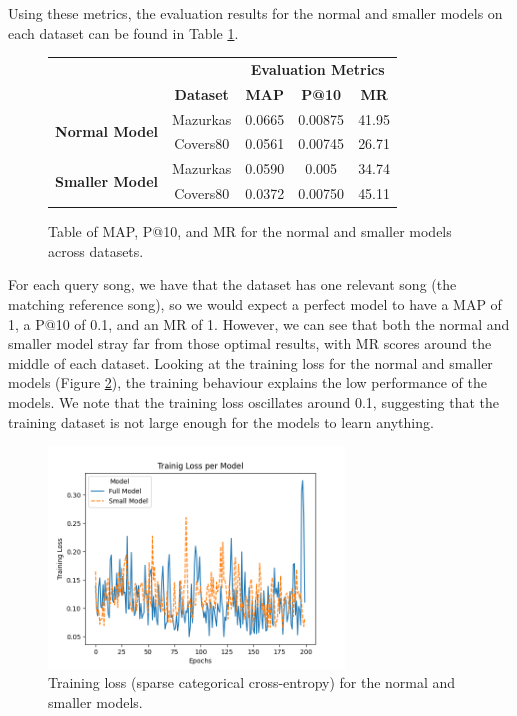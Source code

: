 \documentclass{article}
\begin{document}
Using these metrics, the evaluation results for the normal and smaller models on each dataset can be found in Table \ref{tbl:fullmodelresults}.

{\renewcommand{\arraystretch}{1.3}
\begin{figure}[h]
    \centering
    \begin{tabular}{|c|c|c|c|c|}
        \hline
        \rowcolor{lightgray} & & \multicolumn{3}{|c|}{\textbf{Evaluation Metrics}} \\
        \cline{3-5}
        \rowcolor{lightgray}& \textbf{Dataset} & \textbf{MAP} & \textbf{P@10} & \textbf{MR} \\
        \hline
        \multirow{2}{*}{\textbf{Normal Model}} & Mazurkas & 0.0665 & 0.00875 & 41.95 \\
        \cline{2-5}
        & Covers80 & 0.0561 & 0.00745 & 26.71 \\
        \hline
        \multirow{2}{*}{\textbf{Smaller Model}} & Mazurkas & 0.0590 & 0.005 & 34.74 \\
        \cline{2-5}
        & Covers80 & 0.0372 & 0.00750 & 45.11 \\
        \hline
    \end{tabular}
    \caption{Table of MAP, P@10, and MR for the normal and smaller models across datasets.}
    \label{tbl:fullmodelresults}
\end{figure}

For each query song, we have that the dataset has one relevant song (the matching reference song), so we would expect a perfect model to have a MAP of 1, a P@10 of 0.1, and an MR of 1. However, we can see that both the normal and smaller model stray far from those optimal results, with MR scores around the middle of each dataset. Looking at the training loss for the normal and smaller models (Figure \ref{fig:training-loss}), the training behaviour explains the low performance of the models. We note that the training loss oscillates around 0.1, suggesting that the training dataset is not large enough for the models to learn anything.
\begin{figure}[h]
    \centering
    \includegraphics[width=0.7\textwidth]{figures/training_loss_3.png}
    \caption{Training loss (sparse categorical cross-entropy) for the normal and smaller models.}
    \label{fig:training-loss}
\end{figure}

}
\end{document}
